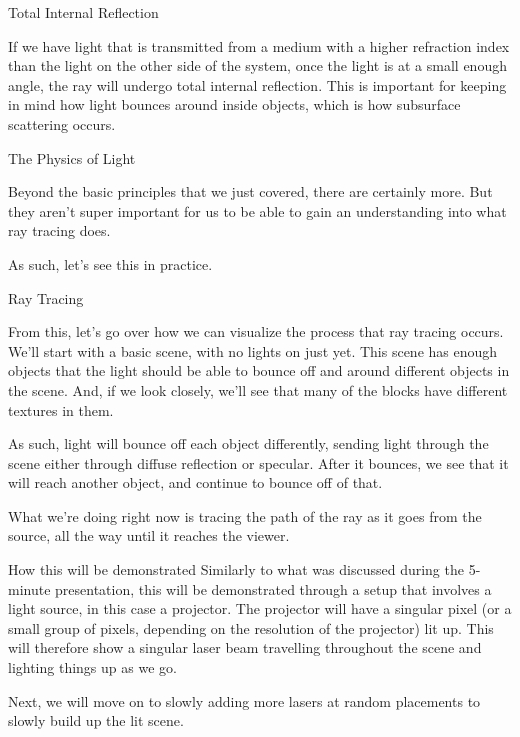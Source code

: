 \documentclass{beamer}
\begin{document}
  \begin{frame}{Total Internal Reflection}

    If we have light that is transmitted from a medium with a higher refraction index than the light on the other side of the system, once the light is at a small enough angle, the ray will undergo total internal reflection.
    This is important for keeping in mind how light bounces around inside objects, which is how subsurface scattering occurs.


  \end{frame}

  \begin{frame}{The Physics of Light}

    Beyond the basic principles that we just covered, there are certainly more.
    But they aren't super important for us to be able to gain an understanding into what ray tracing does.

    \hfill

    As such, let's see this in practice.

  \end{frame}


  \begin{frame}{Ray Tracing}

    From this, let's go over how we can visualize the process that ray tracing occurs.
    We'll start with a basic scene, with no lights on just yet.
    This scene has enough objects that the light should be able to bounce off and around different objects in the scene.
    And, if we look closely, we'll see that many of the blocks have different textures in them.

    \hfill

    As such, light will bounce off each object differently, sending light through the scene either through diffuse reflection or specular.
    After it bounces, we see that it will reach another object, and continue to bounce off of that.

    \hfill

    What we're doing right now is tracing the path of the ray as it goes from the source, all the way until it reaches the viewer.

  \end{frame}

  \begin{frame}{How this will be demonstrated}
    Similarly to what was discussed during the 5-minute presentation, this will be demonstrated through a setup that involves a light source, in this case a projector.
    The projector will have a singular pixel (or a small group of pixels, depending on the resolution of the projector) lit up.
    This will therefore show a singular laser beam travelling throughout the scene and lighting things up as we go.

    Next, we will move on to slowly adding more lasers at random placements to slowly build up the lit scene.
  \end{frame}
\end{document}
